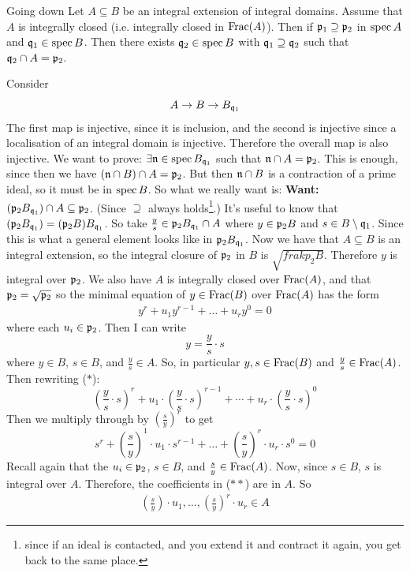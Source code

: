 \documentclass{article}
\begin{document}
\endproof
\begin{fancyprop}{Going down}
    Let $A \subseteq B$ be an integral extension of integral domains. Assume that $A$ is integrally closed (i.e. integrally closed in $\operatorname{Frac}(A)$). Then if $\mathfrak{p}_{1} \supseteq \mathfrak{p}_{2}$ in $\operatorname{spec} A$ and $\mathfrak{q}_{1} \in \operatorname{spec} B$. Then there exists $\mathfrak{q}_{2} \in \operatorname{spec} B$ with $\mathfrak{q}_{1} \supseteq \mathfrak{q}_{2}$ such that $\mathfrak{q}_{2} \cap A = \mathfrak{p}_{2}$.
\end{fancyprop}
\proof Consider \[ A \to B \to B_{\mathfrak{q}_{1}}\]
The first map is injective, since it is inclusion, and the second is injective since a localisation of an integral domain is injective. Therefore the overall map is also injective. We want to prove: $\exists \mathfrak{n} \in \operatorname{spec} B_{\mathfrak{q}_{1}}$ such that $\mathfrak{n} \cap A = \mathfrak{p}_{2}$. \gap This is enough, since then we have $(\mathfrak{n} \cap B) \cap A = \mathfrak{p}_{2}$. But then $\mathfrak{n} \cap B$ is a contraction of a prime ideal, so it must be in $\operatorname{spec} B$. So what we really want is: \gap 
\textbf{Want: } $(\mathfrak{p}_{2} B_{\mathfrak{q}_{1}}) \cap A \subseteq \mathfrak{p}_{2}$. (Since $\supseteq$ always holds\footnote{since if an ideal is contacted, and you extend it and contract it again, you get back to the same place.}.)
It's useful to know that $(\mathfrak{p}_{2}B_{\mathfrak{q}_{1}}) = (\mathfrak{p}_{2} B) B_{\mathfrak{q}_{1}}$. \gap So take $\frac{y}{s} \in \mathfrak{p}_{2}B_{\mathfrak{q}_{1}}\cap A$ where $y \in \mathfrak{p}_{2}B$ and $s \in B\setminus \mathfrak{q}_{1}$. Since this is what a general element looks like in $\mathfrak{p}_{2}B_{\mathfrak{q}_{1}}$. \gap 
Now we have that $A \subseteq B$ is an integral extension, so the integral closure of $\mathfrak{p}_{2}$ in $B$ is $\sqrt{frakp_{2}B}$. Therefore $y$ is integral over $\mathfrak{p}_{2}$. We also have $A$ is integrally closed over $\operatorname{Frac}(A)$, and that $\mathfrak{p}_{2} = \sqrt{\mathfrak{p}_{2}}$ so the minimal equation of $y \in \operatorname{Frac}(B)$ over $\operatorname{Frac}(A)$ has the form \begin{align*}
    y^{r} + u_{1}y^{r-1} + \dots + u_{r}y^{0}=0 \tag{$*$}
\end{align*}
where each $u_{i} \in \mathfrak{p}_{2}$. Then I can write \[ y = \frac{y}{s} \cdot s\] where $y \in B$, $s \in B$, and $\frac{y}{s} \in A$. So, in particular $y,s \in \operatorname{Frac}(B)$ and $\frac{y}{s} \in \operatorname{Frac}(A)$. Then rewriting ($*$): \[ \left( \frac{y}{s} \cdot s\right)^{r} + u_{1}\cdot  \left( \frac{y}{s} \cdot s\right)^{r-1} + \cdots + u_{r} \cdot \left( \frac{y}{s} \cdot s\right)^{0} \]
Then we multiply through by $\left( \frac{s}{y} \right)^{r}$ to get \[ s^{r} + \left(\frac{s}{y} \right)^{1} \cdot u_{1} \cdot s^{r-1} + \dots + \left(\frac{s}{y} \right)^{r}\cdot u_{r} \cdot s^{0} = 0 \tag{$**$}\] Recall again that the $u_{i} \in \mathfrak{p}_{2}$, $s \in B$, and $\frac{s}{y} \in \operatorname{Frac}(A)$. \gap Now, since $s \in B$, $s$ is integral over $A$. Therefore, the coefficients in ($**$) are in $A$. So \begin{align*}
    \left(\frac{s}{y} \right) \cdot u_{1}, \dots, \left(\frac{s}{y} \right)^{r} \cdot u_{r} \in A
\end{align*}
\end{document}
